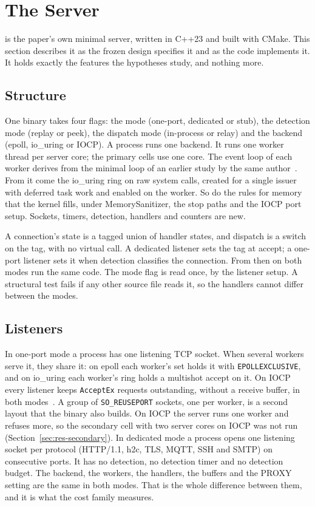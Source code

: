\section{The Server}\label{sec:design}

\oneport{} is the paper's own minimal server, written in C++23 and built with CMake. This section
describes it as the frozen design specifies it and as the code implements it. It holds exactly the
features the hypotheses study, and nothing more.

\subsection{Structure}\label{sec:structure}

One binary takes four flags: the mode (one-port, dedicated or stub), the detection mode (replay or
peek), the dispatch mode (in-process or relay) and the backend (epoll, io\_uring or IOCP). A
process runs one backend. It runs one worker thread per server core; the primary cells use one
core. The event loop of each worker derives from the minimal loop of an earlier study by the same
author~\cite{tsvetanov2026wake}. From it come the io\_uring ring on raw system calls, created for
a single issuer with deferred task work and enabled on the worker. So do the rules for memory that
the kernel fills, under MemorySanitizer, the stop paths and the IOCP port setup. Sockets, timers,
detection, handlers and counters are new.

A connection's state is a tagged union of handler states, and dispatch is a switch on the tag,
with no virtual call. A dedicated listener sets the tag at accept; a one-port listener sets it
when detection classifies the connection. From then on both modes run the same code. The mode
flag is read once, by the listener setup. A structural test fails if any other source file reads
it, so the handlers cannot differ between the modes.

\subsection{Listeners}\label{sec:listeners}

In one-port mode a process has one listening TCP socket. When several workers serve it, they share
it: on epoll each worker's set holds it with \texttt{EPOLLEXCLUSIVE}, and on io\_uring each
worker's ring holds a multishot accept on it. On IOCP every listener keeps \NAcceptex{}
\texttt{AcceptEx} requests outstanding, without a receive buffer, in both
modes~\cite{microsoft2026acceptex}. A group of \texttt{SO\_REUSEPORT} sockets, one per worker, is
a second layout that the binary also builds. On IOCP the server runs one worker and refuses more,
so the secondary cell with two server cores on IOCP was not run (Section~\ref{sec:res-secondary}).
In dedicated mode a process opens one listening socket per
protocol (HTTP/1.1, h2c, TLS, MQTT, SSH and SMTP) on consecutive ports. It has no detection, no
detection timer and no detection budget. The backend, the workers, the handlers, the buffers and
the PROXY setting are the same in both modes. That is the whole difference between them, and it
is what the cost family measures.

